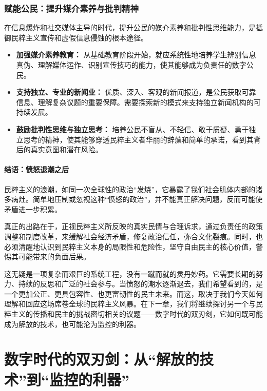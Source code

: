 \documentclass[UTF8, 10pt]{ctexbook}
\begin{document}
\subsection{赋能公民：提升媒介素养与批判精神}
在信息爆炸和社交媒体主导的时代，提升公民的媒介素养和批判性思维能力，是抵御民粹主义宣传和虚假信息侵蚀的根本途径。
\begin{itemize}
    \item \textbf{加强媒介素养教育：} 从基础教育阶段开始，就应系统性地培养学生辨别信息真伪、理解媒体运作、识别宣传技巧的能力，使其能够成为负责任的数字公民。
    \item \textbf{支持独立、专业的新闻业：} 优质、深入、客观的新闻报道，是公民获取可靠信息、理解复杂议题的重要保障。需要探索新的模式来支持独立新闻机构的可持续发展。
    \item \textbf{鼓励批判性思维与独立思考：} 培养公民不盲从、不轻信、敢于质疑、勇于独立思考的精神，使其能够穿透民粹主义者华丽的辞藻和简单的承诺，看到其背后的真实意图和潜在风险。
\end{itemize}

\subsubsection*{结语：愤怒退潮之后}
民粹主义的浪潮，如同一次全球性的政治“发烧”，它暴露了我们社会肌体内部的诸多病灶。简单地压制或忽视这种“愤怒的政治”，并不能真正解决问题，反而可能使矛盾进一步积累。

真正的出路在于，正视民粹主义所反映的真实民情与合理诉求，通过负责任的政策调整和制度改革，来缓解社会经济矛盾，修复政治信任，弥合文化裂痕。同时，也必须清醒地认识到民粹主义本身的局限性和危险性，坚守自由民主的核心价值，警惕其可能带来的负面后果。

这无疑是一项复杂而艰巨的系统工程，没有一蹴而就的灵丹妙药。它需要长期的努力、持续的反思和广泛的社会参与。当愤怒的潮水逐渐退去，我们希望看到的，是一个更加公正、更具包容性、也更富韧性的民主未来。而这，取决于我们今天如何理解和回应这场席卷全球的民粹主义风暴。在下一章，我们将继续探讨另一个与民粹主义的传播和民主的挑战密切相关的议题——数字时代的双刃剑，它如何既可能成为解放的技术，也可能沦为监控的利器。

\chapter{数字时代的双刃剑：从“解放的技术”到“监控的利器”}
\end{document}
